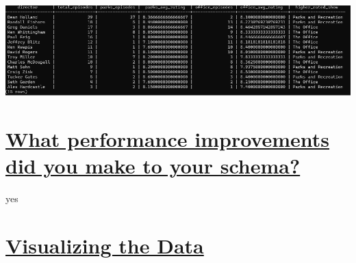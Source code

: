 \documentclass{article}
\begin{document}
\begin{enumerate}
\begin{verbatim}
    \end{verbatim}

\includegraphics[width=1\textwidth]{q3.png}

 \end{enumerate}

\section*{\underline{What performance improvements did you make to your schema?}}
yes

\clearpage
\section*{\underline{Visualizing the Data}}
\end{document}
